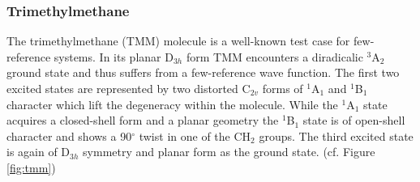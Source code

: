 \documentclass[aip,graphicx,amsmath,reprint]{revtex4-1}
\begin{document}
\subsubsection{Trimethylmethane}

The trimethylmethane (TMM) molecule is a well-known test case for few-reference systems. In its planar D$_{3h}$ form TMM encounters a diradicalic $^3$A$_2$ ground state and thus suffers from a few-reference wave function. The first two excited states are represented by two distorted C$_{2v}$ forms of $^1$A$_1$ and $^1$B$_1$ character which lift the degeneracy within the molecule. While the $^1$A$_1$ state acquires a closed-shell form and a planar geometry the $^1$B$_1$ state is of open-shell character and shows a 90$^\circ$ twist in one of the CH$_2$ groups. The third excited state is again of D$_{3h}$ symmetry and planar form as the ground state. (cf. Figure \ref{fig:tmm})\\
\end{document}
